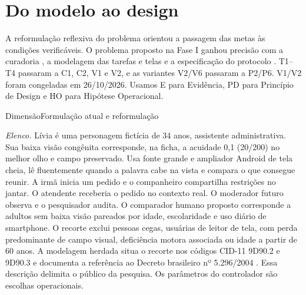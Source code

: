 \section{Do modelo ao design}
A reformulação reflexiva do problema \cite{schon} orientou a passagem das metas às condições verificáveis. O problema proposto na Fase I \cite{fase1} ganhou precisão com a curadoria \cite{pesquisa}, a modelagem das tarefas e telas \cite[apêndices B e C]{modelagem} e a especificação do protocolo \cite[pp.~1--8]{hts}. T1--T4 passaram a C1, C2, V1 e V2, e as variantes V2/V6 passaram a P2/P6. V1/V2 foram congeladas em 26/10/2026. Usamos E para Evidência, PD para Princípio de Design e HO para Hipótese Operacional.
\begin{uxtable}{Dimensão}{Formulação atual e reformulação}
\end{uxtable}
\textit{Elenco.} Lívia é uma personagem fictícia de 34 anos, assistente administrativa. Sua baixa visão congênita corresponde, na ficha, a acuidade 0,1 (20/200) no melhor olho e campo preservado. Usa fonte grande e ampliador Android de tela cheia, lê fluentemente quando a palavra cabe na vista e compara o que consegue reunir. A irmã inicia um pedido e o companheiro compartilha restrições no jantar. O atendente receberia o pedido no contexto real. O moderador futuro observa e o pesquisador audita. O comparador humano proposto corresponde a adultos sem baixa visão pareados por idade, escolaridade e uso diário de smartphone. O recorte exclui pessoas cegas, usuárias de leitor de tela, com perda predominante de campo visual, deficiência motora associada ou idade a partir de 60 anos.
A modelagem herdada situa o recorte nos códigos CID-11 9D90.2 e 9D90.3 e documenta a referência ao Decreto brasileiro nº 5.296/2004 \cite[pp.~3, 10--11]{modelagem}. Essa descrição delimita o público da pesquisa. Os parâmetros do controlador são escolhas operacionais.
